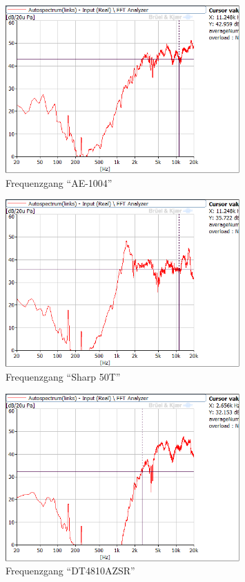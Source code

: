 \begin{figure} [H]
	\centering
	\includegraphics[width=0.8\textwidth]{img/LSMessung/HT/AE1004_1m_erhoeht.png}
	\caption{Frequenzgang \enquote{AE-1004}}
	\label{fig:4.3.2}
\end{figure}

\begin{figure} [H]
	\centering
	\includegraphics[width=0.8\textwidth]{img/LSMessung/HT/Sharp_1m_erhoeht.png}
	\caption{Frequenzgang \enquote{Sharp 50T}}
	\label{fig:4.3.3}
\end{figure}

\begin{figure} [H]
	\centering
	\includegraphics[width=0.8\textwidth]{img/LSMessung/HT/DT4810ASZR_1m_erhoeht.png}
	\caption{Frequenzgang \enquote{DT4810AZSR}}
	\label{fig:4.3.4}
\end{figure}

